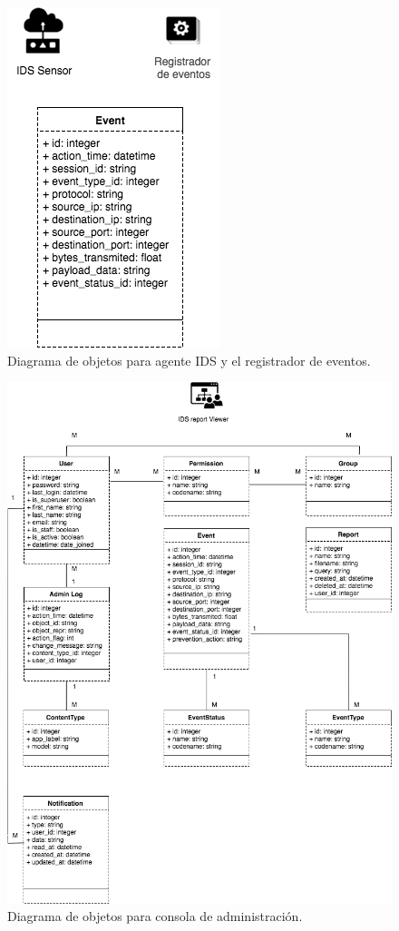 \begin{figure}
	\centering
	\includegraphics[scale=.6]{images/Diagrama_Objetos_Sensor_IDS}
	\caption{Diagrama de objetos para agente IDS y el registrador de eventos.}
	\label{fig:ids_doosensor}
\end{figure}

\begin{figure}
	\centering
	\includegraphics[scale=.6]{images/Diagrama_de_objetos}
	\caption{Diagrama de objetos para consola de administración.}
	\label{fig:ids_doos}
\end{figure}

